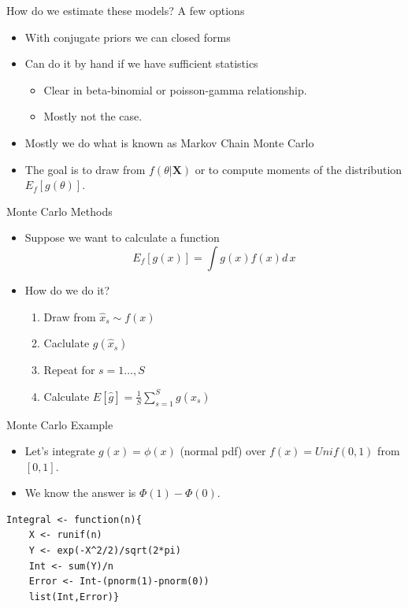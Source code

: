 \documentclass[aspectratio=169]{beamer}
\begin{document}
\begin{frame}{How do we estimate these models?}
A few options
\begin{itemize}
\item With conjugate priors we can closed forms
\item Can do it by hand if we have \alert{sufficient statistics}
\begin{itemize}
\item Clear in beta-binomial or poisson-gamma relationship.
\item Mostly not the case.
\end{itemize}
\item Mostly we do what is known as \alert{Markov Chain Monte Carlo}
\item The goal is to draw from $f(\theta | \mathbf{X})$ or to compute moments of the distribution $E_f[g(\theta)]$.
\end{itemize}
\end{frame}

\begin{frame}{Monte Carlo Methods}
\begin{itemize}
\item Suppose we want to calculate a function 
$$E_f[g(x)] = \int g(x) f(x) d\,x$$
\item How do we do it?
\begin{enumerate}
\item Draw from $\hat{x}_s \sim f(x)$
\item Caclulate $g(\hat{x}_s)$
\item Repeat for $s=1\ldots,S$
\item Calculate $E[\hat{g}]=\frac{1}{S} \sum_{s=1}^S g(\hat{x}_s)$
\end{enumerate}
\end{itemize}
\end{frame}


\begin{frame}[fragile]{Monte Carlo Example}
\begin{itemize}
\item Let's integrate $g(x) = \phi(x)$ (normal pdf) over $f(x) = Unif(0,1)$ from $[0,1]$.
\item We know the answer is $\Phi(1) - \Phi(0)$.
\end{itemize}
\begin{verbatim}
Integral <- function(n){
    X <- runif(n)
    Y <- exp(-X^2/2)/sqrt(2*pi)
    Int <- sum(Y)/n
    Error <- Int-(pnorm(1)-pnorm(0))
    list(Int,Error)}
\end{verbatim}

\end{frame}
\end{document}
